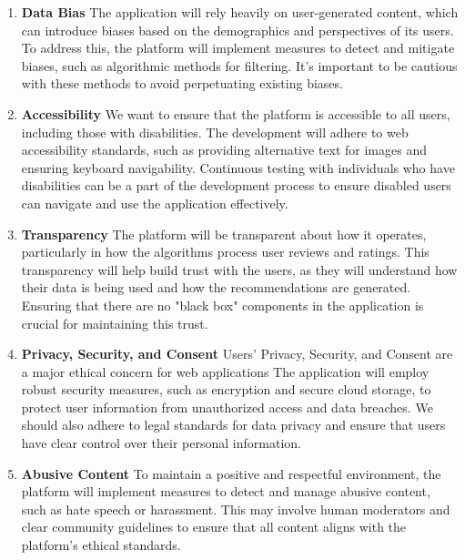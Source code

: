\documentclass[10pt,twocolumn]{article}
\begin{document}
    \begin{enumerate}
        \item \textbf{Data Bias} The application will rely heavily on user-generated content, which can introduce biases based on the demographics and perspectives of its users. To address this, the platform will implement measures to detect and mitigate biases, such as algorithmic methods for filtering. It's important to be cautious with these methods to avoid perpetuating existing biases. 

        \item \textbf{Accessibility} We want to ensure that the platform is accessible to all users, including those with disabilities. The development will adhere to web accessibility standards, such as providing alternative text for images and ensuring keyboard navigability. Continuous testing with individuals who have disabilities can be a part of the development process to ensure disabled users can navigate and use the application effectively.

        \item \textbf{Transparency} The platform will be transparent about how it operates, particularly in how the algorithms process user reviews and ratings. This transparency will help build trust with the users, as they will understand how their data is being used and how the recommendations are generated. Ensuring that there are no "black box" components in the application is crucial for maintaining this trust.

        \item \textbf{Privacy, Security, and Consent} Users' Privacy, Security, and Consent are a major ethical concern for web applications The application will employ robust security measures, such as encryption and secure cloud storage, to protect user information from unauthorized access and data breaches. We should also adhere to legal standards for data privacy and ensure that users have clear control over their personal information. 

        \item \textbf{Abusive Content} To maintain a positive and respectful environment, the platform will implement measures to detect and manage abusive content, such as hate speech or harassment. This may involve human moderators and clear community guidelines to ensure that all content aligns with the platform’s ethical standards.
    \end{enumerate}
    
\end{document}
